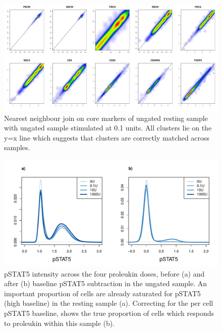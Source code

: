 \hspace{-2cm}
\begin{figure}[h]
\centering
\includegraphics[scale=.3]{IL2/figures/ann-join-0U-01U.pdf}
{Nearest neighbour join on core markers of ungated resting sample with ungated sample stimulated at 0.1 units. }
{
All clusters lie on the y=x line which suggests that clusters are correctly matched across samples.
}
\end{figure}


\hspace{-2cm}
\begin{figure}[h]
\centering
\includegraphics[scale=.5]{IL2/figures/pstat5-baseline-relative.pdf}
{ pSTAT5 intensity across the four proleukin doses, before (a) and after (b) baseline pSTAT5 subtraction in the ungated sample.}
{
  An important proportion of cells are already saturated for pSTAT5 (high baseline) in the resting sample (a).
  Correcting for the per cell pSTAT5 baseline, shows the true proportion of cells which responds to proleukin within this sample (b).
}
\end{figure}






